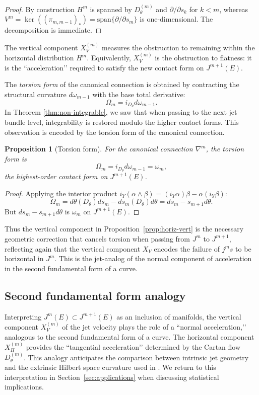 \documentclass[3p,times]{elsarticle}
\newtheorem{proposition}{Proposition}[section]
\begin{document}
\begin{proof}
By construction $H^{m}$ is spanned by $D^{(m)}_\theta$ and $\partial/\partial s_k$ for $k< m$,
whereas $V^{m}=\ker((\pi_{m,m-1})_*)=\mathrm{span}\{\partial/\partial s_m\}$ is one-dimensional.
The decomposition is immediate.
\end{proof}

The vertical component $X^{(m)}_V$ measures the obstruction to remaining within the horizontal distribution
$H^{m}$.  
Equivalently, $X^{(m)}_V$ is the obstruction to flatness: it is the ``acceleration’’ required to satisfy the
new contact form on $J^{m+1}(E)$.

The {\em torsion form} of the canonical connection is obtained by contracting the structural curvature 
$d\omega_{m-1}$ with the base total derivative:
\[
 \Omega_m = i_{D_\theta} d\omega_{m-1}.
\]
In Theorem \ref{thm:non-integrable}, we saw that when passing to the next jet bundle level, integrability is restored modulo the higher contact forms.  
This observation is encoded by the torsion form of the canonical connection.

\begin{proposition}[Torsion form]
\label{prop:torsion}
For the canonical connection $\nabla^{m}$, the torsion form is
\[
\Omega_m=i_{D_\theta}d\omega_{m-1}
     =\omega_{m},
\]
the highest-order contact form on $J^{m+1}(E)$.
\end{proposition}

\begin{proof}
Applying the interior product $i_Y (\alpha \wedge \beta) = (i_Y \alpha) \beta - \alpha (i_Y \beta)$:
\[
\Omega_m = d\theta(D_\theta) ds_m - ds_m(D_\theta) d\theta=ds_m-s_{m+1}d\theta. 
\]But $ds_m-s_{m+1}d\theta$ is $\omega_m$ on $J^{m+1}(E)$.
\end{proof}

Thus the vertical component in Proposition~\ref{prop:horiz-vert} is
the necessary geometric correction that cancels torsion when passing from $J^{m}$ to $J^{m+1}$, reflecting again that the vertical component $X_V$ encodes the failure of $j^{m}s$ to be horizontal in $J^{m}$.
This is the jet-analog of the normal component of acceleration in the second fundamental form of a
curve.

\subsection{Second fundamental form analogy}

Interpreting $J^{m}(E)\subset J^{m+1}(E)$ as an inclusion of manifolds,
the vertical component $X^{(m)}_V$ of the jet velocity plays the role of a ``normal acceleration,’’ analogous to
the second fundamental form of a curve.  
The horizontal component $X^{(m)}_H$ provides the ``tangential acceleration’’ determined by the Cartan flow
$D^{(m)}_\theta$.
This analogy anticipates the comparison between intrinsic jet geometry and the extrinsic Hilbert space curvature
used in \cite{SRK}.  
We return to this interpretation in Section~\ref{sec:applications} when discussing statistical
implications.
\end{document}
